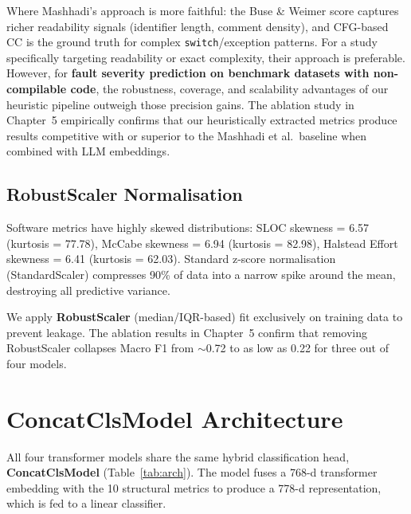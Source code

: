 \documentclass[12pt, a4paper]{report}
\begin{document}
Where Mashhadi's approach is more faithful: the Buse \& Weimer score captures richer readability signals (identifier length, comment density), and CFG-based CC is the ground truth for complex \texttt{switch}/exception patterns. For a study specifically targeting readability or exact complexity, their approach is preferable. However, for \textbf{fault severity prediction on benchmark datasets with non-compilable code}, the robustness, coverage, and scalability advantages of our heuristic pipeline outweigh those precision gains. The ablation study in Chapter~5 empirically confirms that our heuristically extracted metrics produce results competitive with or superior to the Mashhadi et al.\ baseline when combined with LLM embeddings.

\subsection{RobustScaler Normalisation}

Software metrics have highly skewed distributions: SLOC skewness = 6.57 (kurtosis = 77.78), McCabe skewness = 6.94 (kurtosis = 82.98), Halstead Effort skewness = 6.41 (kurtosis = 62.03). Standard z-score normalisation (StandardScaler) compresses 90\% of data into a narrow spike around the mean, destroying all predictive variance.

We apply \textbf{RobustScaler} (median/IQR-based) fit exclusively on training data to prevent leakage. The ablation results in Chapter~5 confirm that removing RobustScaler collapses Macro F1 from $\sim$0.72 to as low as 0.22 for three out of four models.

\section{ConcatClsModel Architecture}

All four transformer models share the same hybrid classification head, \textbf{ConcatClsModel} (Table~\ref{tab:arch}). The model fuses a 768-d transformer embedding with the 10 structural metrics to produce a 778-d representation, which is fed to a linear classifier.
\end{document}
